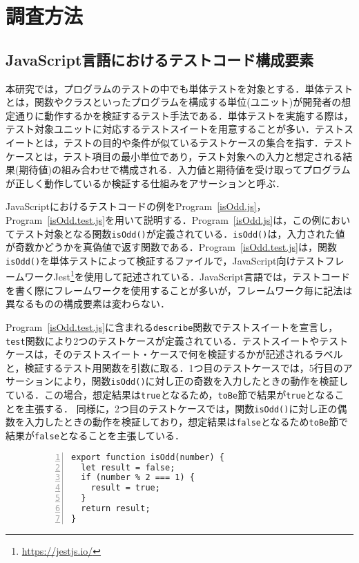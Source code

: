 \documentclass[11pt,dvipdfmx]{jreport}
\begin{document}
\section{調査方法}
\subsection{JavaScript言語におけるテストコード構成要素}
本研究では，プログラムのテストの中でも単体テストを対象とする．単体テストとは，関数やクラスといったプログラムを構成する単位(ユニット)が開発者の想定通りに動作するかを検証するテスト手法である．単体テストを実施する際は，テスト対象ユニットに対応するテストスイートを用意することが多い．テストスイートとは，テストの目的や条件が似ているテストケースの集合を指す．テストケースとは，テスト項目の最小単位であり，テスト対象への入力と想定される結果(期待値)の組み合わせで構成される．入力値と期待値を受け取ってプログラムが正しく動作しているか検証する仕組みをアサーションと呼ぶ．

JavaScriptにおけるテストコードの例をProgram~\ref{isOdd.js}，Program~\ref{isOdd.test.js}を用いて説明する．Program~\ref{isOdd.js}は，この例においてテスト対象となる関数{\verb|isOdd()|}が定義されている．{\verb|isOdd()|}は，入力された値が奇数かどうかを真偽値で返す関数である．Program~\ref{isOdd.test.js}は，関数{\verb|isOdd()|}を単体テストによって検証するファイルで，JavaScript向けテストフレームワークJest\footnote{\url{https://jestjs.io/}}を使用して記述されている．JavaScript言語では，テストコードを書く際にフレームワークを使用することが多いが，フレームワーク毎に記法は異なるものの構成要素は変わらない．

Program~\ref{isOdd.test.js}に含まれる{\verb|describe|}関数でテストスイートを宣言し，{\verb|test|}関数により2つのテストケースが定義されている．テストスイートやテストケースは，そのテストスイート・ケースで何を検証するかが記述されるラベルと，検証するテスト用関数を引数に取る．1つ目のテストケースでは，5行目のアサーションにより，関数{\verb|isOdd()|}に対し正の奇数を入力したときの動作を検証している．この場合，想定結果は{\verb|true|}となるため，{\verb|toBe|}節で結果が{\verb|true|}となることを主張する．
同様に，2つ目のテストケースでは，関数{\verb|isOdd()|}に対し正の偶数を入力したときの動作を検証しており，想定結果は{\verb|false|}となるため{\verb|toBe|}節で結果が{\verb|false|}となることを主張している．

\begin{figure}[t]
  \begin{lstlisting}[caption={[upper/lower text]%
    \begin{tabular}[t]{@{}l@{}}
      isOdd.js \\[1.0\normalbaselineskip]
    \end{tabular}}, frame={tb}, numbers=left, label=isOdd.js, identifierstyle={\small}]
export function isOdd(number) {
  let result = false;
  if (number % 2 === 1) {
    result = true;
  }
  return result;
}
  \end{lstlisting}
  \vspace{-6mm}
\end{figure}
\end{document}
